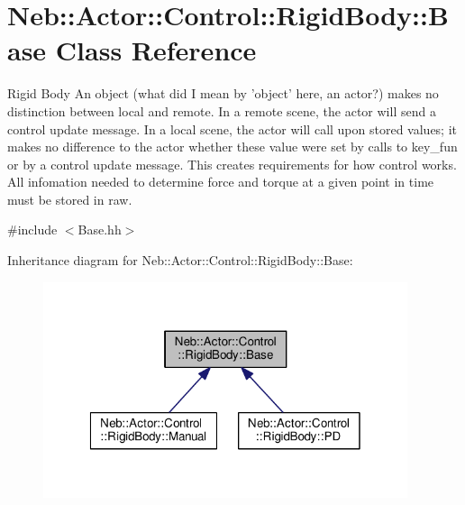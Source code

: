 \hypertarget{classNeb_1_1Actor_1_1Control_1_1RigidBody_1_1Base}{\section{Neb\-:\-:Actor\-:\-:Control\-:\-:Rigid\-Body\-:\-:Base Class Reference}
\label{classNeb_1_1Actor_1_1Control_1_1RigidBody_1_1Base}
}


Rigid Body An object (what did I mean by 'object' here, an actor?) makes no distinction between local and remote. In a remote scene, the actor will send a control update message. In a local scene, the actor will call upon stored values; it makes no difference to the actor whether these value were set by calls to key\-\_\-fun or by a control update message. This creates requirements for how control works. All infomation needed to determine force and torque at a given point in time must be stored in raw.  




{\ttfamily \#include $<$Base.\-hh$>$}



Inheritance diagram for Neb\-:\-:Actor\-:\-:Control\-:\-:Rigid\-Body\-:\-:Base\-:
\nopagebreak
\begin{figure}[H]
\begin{center}
\leavevmode
\includegraphics[width=303pt]{classNeb_1_1Actor_1_1Control_1_1RigidBody_1_1Base__inherit__graph}
\end{center}
\end{figure}
